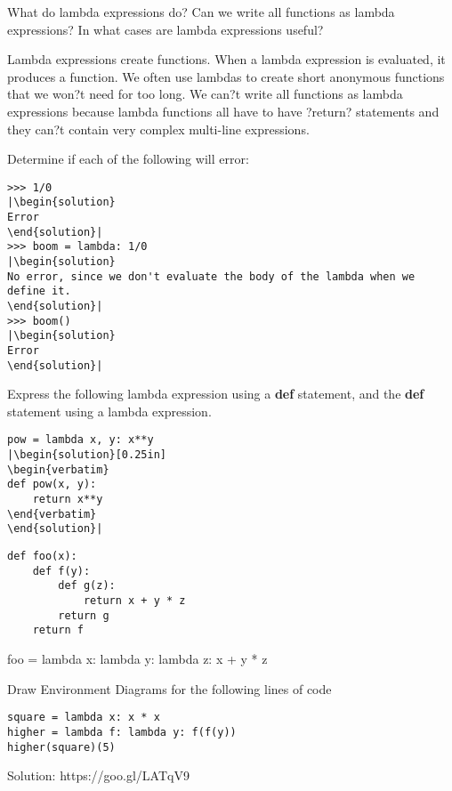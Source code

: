 \question
What do lambda expressions do? Can we write all functions as lambda expressions? In what cases are lambda expressions useful? 
\begin{solution}[0.75in]
Lambda expressions create functions. When a lambda expression is evaluated, it produces a function. We often use lambdas to create short anonymous functions that we won?t need for too long. \newline We can?t write all functions as lambda expressions because lambda functions all have to have ?return? statements and they can?t contain very complex multi-line expressions.
\end{solution}

\question
Determine if each of the following will error: \newline
\begin{lstlisting}
>>> 1/0
|\begin{solution}
Error
\end{solution}|
>>> boom = lambda: 1/0
|\begin{solution}
No error, since we don't evaluate the body of the lambda when we define it.
\end{solution}|
>>> boom()
|\begin{solution}
Error
\end{solution}|
\end{lstlisting}

\question
Express the following lambda expression using a \textbf{def} statement, and the \textbf{def} statement using a lambda expression.
\begin{lstlisting}
pow = lambda x, y: x**y
|\begin{solution}[0.25in]
\begin{verbatim}
def pow(x, y):
    return x**y
\end{verbatim}
\end{solution}|
\end{lstlisting}

\begin{lstlisting}
def foo(x):
    def f(y):
        def g(z):
            return x + y * z
        return g
    return f
\end{lstlisting}
\begin{solution}[0.25in]
foo = lambda x: lambda y: lambda z: x + y * z
\end{solution}
\newpage
\question 
Draw Environment Diagrams for the following lines of code
\begin{lstlisting}
square = lambda x: x * x
higher = lambda f: lambda y: f(f(y))
higher(square)(5)
\end{lstlisting}
\begin{solution}
Solution: https://goo.gl/LATqV9
\end{solution}

